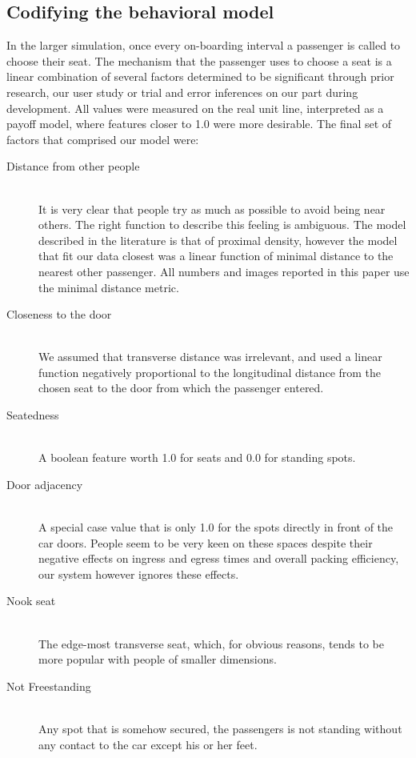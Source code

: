 \documentclass{acm_proc_article-sp}
\begin{document}
\subsection{Codifying the behavioral model}
In the larger simulation, once every on-boarding interval a passenger is called to choose their seat. The mechanism that the passenger uses to choose a seat is a linear combination of several factors determined to be significant through prior research\cite{evans2007crowding, hai1982sex, maines1979ecological}, our user study or trial and error inferences on our part during development. All values were measured on the real unit line, interpreted as a payoff model, where features closer to 1.0 were more desirable. The final set of factors that comprised our model were:

\begin{description}
  \item[Distance from other people] \hfill \\
  It is very clear that people try as much as possible to avoid being near others. The right function to describe this feeling is ambiguous. The model described in the literature is that of proximal density\cite{evans2007crowding}, however the model that fit our data closest was a linear function of minimal distance to the nearest other passenger. All numbers and images reported in this paper use the minimal distance metric.
  \item[Closeness to the door] \hfill \\
  We assumed that transverse distance was irrelevant, and used a linear function negatively proportional to the longitudinal distance from the chosen seat to the door from which the passenger entered.
  \item[Seatedness] \hfill \\
  A boolean feature worth 1.0 for seats and 0.0 for standing spots.
  \item[Door adjacency] \hfill \\
  A special case value that is only 1.0 for the spots directly in front of the car doors. People seem to be very keen on these spaces despite their negative effects on ingress and egress times and overall packing efficiency, our system however ignores these effects.
  \item[Nook seat] \hfill \\
  The edge-most transverse seat, which, for obvious reasons, tends to be more popular with people of smaller dimensions.
  \item[Not Freestanding] \hfill \\
  Any spot that is somehow secured, the passengers is not standing without any contact to the car except his or her feet.
\end{description}
\end{document}
